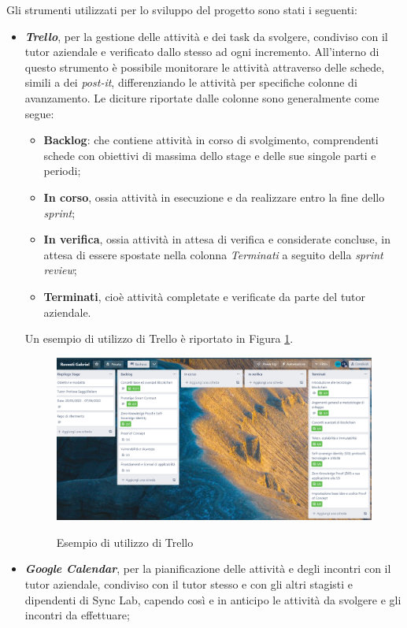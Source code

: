Gli strumenti utilizzati per lo sviluppo del progetto sono stati i seguenti:
\begin{itemize}
    \item{\textit{\textbf{Trello}}}, per la gestione delle attività e dei task da svolgere, condiviso con il tutor aziendale e verificato dallo stesso ad ogni incremento.
    All'interno di questo strumento è possibile monitorare le attività attraverso delle schede, simili a dei \textit{post-it}, differenziando le attività per specifiche colonne di avanzamento.
    Le diciture riportate dalle colonne sono generalmente come segue:
    \begin{itemize}
        \item{\textbf{Backlog}}: che contiene attività in corso di svolgimento, comprendenti schede con obiettivi di massima dello stage e delle sue singole parti e periodi;
        \item{\textbf{In corso}}, ossia attività in esecuzione e da realizzare entro la fine dello \textit{sprint};
        \item{\textbf{In verifica}}, ossia attività in attesa di verifica e considerate concluse, in attesa di essere spostate nella colonna \textit{Terminati} a seguito della \textit{sprint review};
        \item{\textbf{Terminati}}, cioè attività completate e verificate da parte del tutor aziendale.
    \end{itemize} 
    Un esempio di utilizzo di Trello è riportato in Figura \ref{fig:trello}.
    \begin{figure}[h]
        \centering
        \includegraphics[width=1\textwidth, alt={Esempio di utilizzo di Trello}]{immagini/trello.png}
        \caption{Esempio di utilizzo di Trello}\label{fig:trello}
    \end{figure}

    \item{\textit{\textbf{Google Calendar}}}, per la pianificazione delle attività e degli incontri con il tutor aziendale, condiviso con il tutor stesso e con gli altri stagisti 
    e dipendenti di Sync Lab, capendo così e in anticipo le attività da svolgere e gli incontri da effettuare;
    

\end{itemize}
